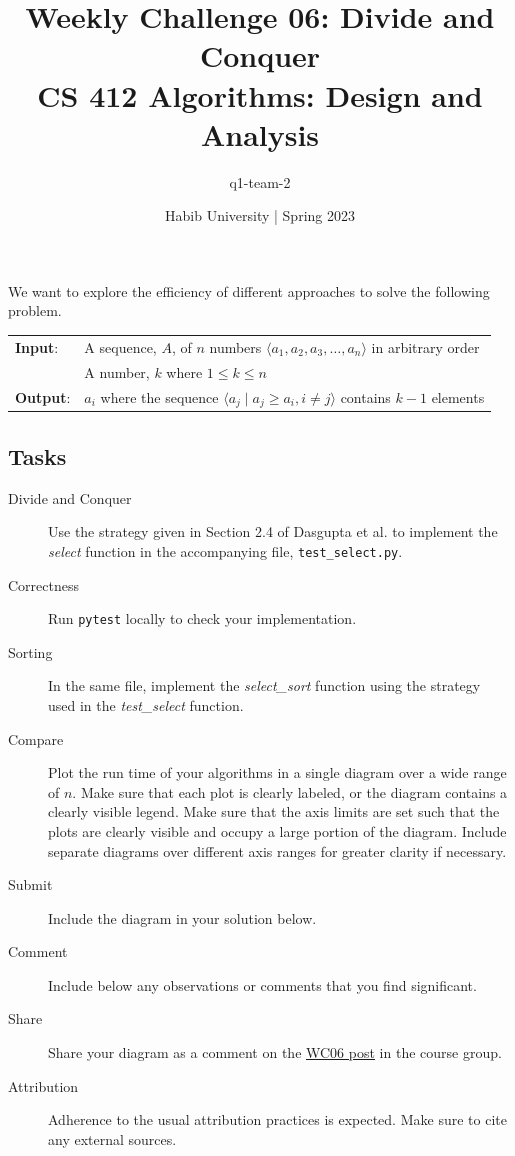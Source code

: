 \documentclass[a4paper]{exam}
\title{Weekly Challenge 06: Divide and Conquer\\CS 412 Algorithms: Design and Analysis}
\author{q1-team-2}  %
\date{Habib University | Spring 2023}
\begin{document}
\maketitle

\begin{questions}



	We want to explore the efficiency of different approaches to solve the following problem.

	\begin{tabular}{ll}
		\textbf{Input}:  & A sequence, $A$, of $n$ numbers $\langle a_1, a_2, a_3, \ldots, a_n \rangle$ in arbitrary order   \\
		                 & A number, $k$ where $1 \leq k \leq n$                                                             \\
		\textbf{Output}: & $a_i$ where the sequence $\langle a_j \mid a_j \geq a_i, i\neq j \rangle$ contains $k-1$ elements
	\end{tabular}
	\smallskip

	\subsection*{Tasks}
	\begin{description}
		\item[Divide and Conquer] Use the strategy given in Section 2.4 of Dasgupta et al. to implement the \textit{select} function in the accompanying file, \texttt{test\_select.py}.
		\item[Correctness] Run \texttt{pytest} locally to check your implementation.
		\item[Sorting] In the same file, implement the \textit{select\_sort} function using the strategy used in the \textit{test\_select} function.
		\item[Compare] Plot the run time of your algorithms in a single diagram over a wide range of $n$. Make sure that each plot is clearly labeled, or the diagram contains a clearly visible legend. Make sure that the axis limits are set such that the plots are clearly visible and occupy a large portion of the diagram. Include separate diagrams over different axis ranges for greater clarity if necessary.
		\item[Submit] Include the diagram in your solution below.
		\item[Comment] Include below any observations or comments that you find significant.
		\item[Share] Share your diagram as a comment on the \href{https://web.yammer.com/main/org/habib.edu.pk/threads/eyJfdHlwZSI6IlRocmVhZCIsImlkIjoiMjEzNDMyMjU5OTgxMzEyMCJ9}{WC06 post} in the course group.
		\item[Attribution] Adherence to the usual attribution practices is expected. Make sure to cite any external sources.
	\end{description}


\end{questions}
\end{document}
